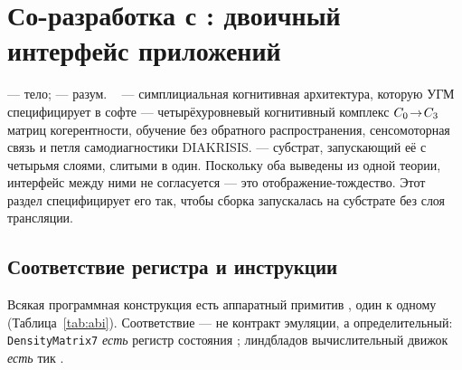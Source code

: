 \section{Со-разработка с \SYNARC{}: двоичный интерфейс приложений}
\label{sec:abi}

\TALOS{} --- тело; \SYNARC{} --- разум. \SYNARC{}~\cite{synarc2026} --- симплициальная
когнитивная архитектура, которую УГМ специфицирует в софте --- четырёхуровневый
когнитивный комплекс $C_0\!\to\!C_3$ матриц когерентности, обучение без
обратного распространения, сенсомоторная связь и петля самодиагностики DIAKRISIS.
\TALOS{} --- субстрат, запускающий её с четырьмя слоями, слитыми в один.
Поскольку оба выведены из одной теории, интерфейс между ними не согласуется ---
это отображение-тождество. Этот раздел специфицирует его так, чтобы сборка
\SYNARC{} запускалась на субстрате \TALOS{} без слоя трансляции.

\subsection{Соответствие регистра и инструкции}

Всякая программная конструкция \SYNARC{} есть аппаратный примитив \TALOS{}, один к
одному (Таблица~\ref{tab:abi}). Соответствие --- не контракт эмуляции, а
определительный: \texttt{DensityMatrix7} \SYNARC{} \emph{есть} регистр состояния
\TALOS{}; линдбладов вычислительный движок \SYNARC{} \emph{есть} тик \TALOS{}.

